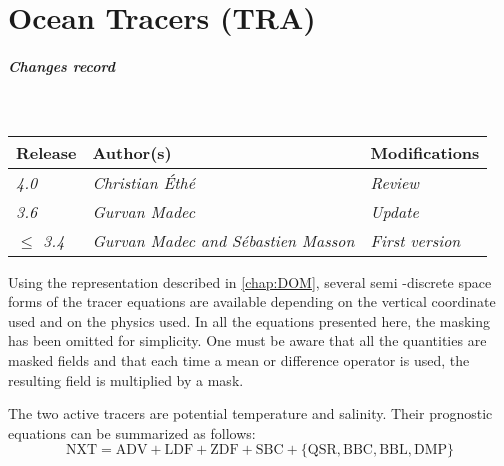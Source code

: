 \documentclass[../main/NEMO_manual]{subfiles}
\begin{document}
\chapter{Ocean Tracers (TRA)}
\label{chap:TRA}

\thispagestyle{plain}

\chaptertoc

\paragraph{Changes record} ~\\

{\footnotesize
  \begin{tabularx}{\textwidth}{l||X|X}
    Release          & Author(s)                                   & Modifications       \\
    \hline
    {\em        4.0} & {\em Christian \'{E}th\'{e}               } & {\em Review       } \\
    {\em        3.6} & {\em Gurvan Madec                         } & {\em Update       } \\
    {\em $\leq$ 3.4} & {\em Gurvan Madec and S\'{e}bastien Masson} & {\em First version} \\
  \end{tabularx}
}

\clearpage



Using the representation described in \autoref{chap:DOM}, several semi -discrete space forms of
the tracer equations are available depending on the vertical coordinate used and on the physics used.
In all the equations presented here, the masking has been omitted for simplicity.
One must be aware that all the quantities are masked fields and that
each time a mean or difference operator is used, the resulting field is multiplied by a mask.

The two active tracers are potential temperature and salinity.
Their prognostic equations can be summarized as follows:
\[
  \text{NXT} =     \text{ADV} + \text{LDF} + \text{ZDF} + \text{SBC}
               + \{\text{QSR},  \text{BBC},  \text{BBL},  \text{DMP}\}
\]
\end{document}
